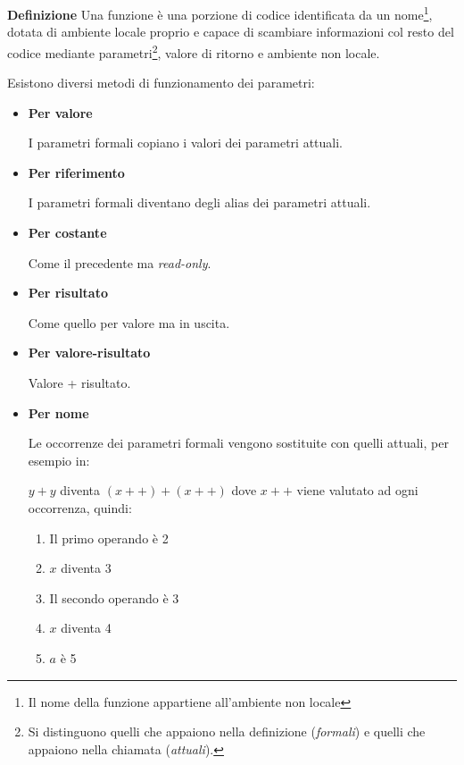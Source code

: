 \documentclass{article}
\newcommand{\df}{\noindent\textbf{Definizione} }
\begin{document}
\df Una funzione è una porzione di codice identificata da un nome\footnote{Il nome della funzione appartiene all'ambiente non locale}, dotata di ambiente locale proprio e capace di scambiare informazioni col resto del codice mediante parametri\footnote{Si distinguono quelli che appaiono nella definizione (\textit{formali}) e quelli che appaiono nella chiamata (\textit{attuali}).}, valore di ritorno e ambiente non locale. \newline

Esistono diversi metodi di funzionamento dei parametri:
\begin{itemize}
    \item \textbf{Per valore}

        I parametri formali copiano i valori dei parametri attuali.
    
    \item \textbf{Per riferimento}

        I parametri formali diventano degli alias dei parametri attuali.      
    
    \item \textbf{Per costante}

        Come il precedente ma \textit{read-only}.
    
    \item \textbf{Per risultato}

        Come quello per valore ma in uscita.
    
    \item \textbf{Per valore-risultato}

        Valore + risultato.
    
    \item \textbf{Per nome}

        Le occorrenze dei parametri formali vengono sostituite con quelli attuali, per esempio in:

        \begin{algorithm}
        \end{algorithm}

        $y+y$ diventa $(x++)+(x++)$ dove $x++$ viene valutato ad ogni occorrenza, quindi:
        \begin{enumerate}
            \item Il primo operando è 2
            \item $x$ diventa 3
            \item Il secondo operando è 3
            \item $x$ diventa 4
            \item $a$ è 5
        \end{enumerate}
    
\end{itemize}

\vspace{3pt}
\end{document}
